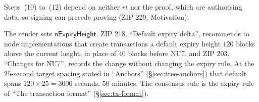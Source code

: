 \documentclass[11pt,a4paper]{article}
\theoremstyle{definition}
\begin{document}
Steps~(10) to~(12) depend on neither $\mathit{rt}$ nor the proof, which
are authorising data, so signing can precede proving (ZIP 229, Motivation).

The sender sets $\mathsf{nExpiryHeight}$. ZIP 218, ``Default expiry
delta'', recommends to node implementations that create transactions a
default expiry height $120$ blocks above the current height, in place of
$40$ blocks before NU7, and ZIP 203, ``Changes for NU7'', records the change
without changing the expiry rule. At the $25$-second target spacing stated
in ``Anchors'' (\S\ref{sec:tree-anchors}) that default spans
$120 \times 25 = 3000$ seconds, $50$ minutes. The consensus rule is the
expiry rule of ``The transaction format'' (\S\ref{sec:tx-format}).
\end{document}
